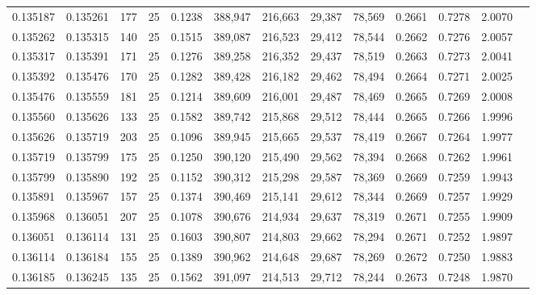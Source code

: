 \begin{tabular}{rrrrrrrrrrrrr}
0.135187 & 0.135261 &   177 &  25 &                                     0.1238 & 388,947 & 216,663 &  29,387 &  78,569 & 0.2661 & 0.7278 & 2.0070 \\
0.135262 & 0.135315 &   140 &  25 &                                     0.1515 & 389,087 & 216,523 &  29,412 &  78,544 & 0.2662 & 0.7276 & 2.0057 \\
0.135317 & 0.135391 &   171 &  25 &                                     0.1276 & 389,258 & 216,352 &  29,437 &  78,519 & 0.2663 & 0.7273 & 2.0041 \\
0.135392 & 0.135476 &   170 &  25 &                                     0.1282 & 389,428 & 216,182 &  29,462 &  78,494 & 0.2664 & 0.7271 & 2.0025 \\
0.135476 & 0.135559 &   181 &  25 &                                     0.1214 & 389,609 & 216,001 &  29,487 &  78,469 & 0.2665 & 0.7269 & 2.0008 \\
0.135560 & 0.135626 &   133 &  25 &                                     0.1582 & 389,742 & 215,868 &  29,512 &  78,444 & 0.2665 & 0.7266 & 1.9996 \\
0.135626 & 0.135719 &   203 &  25 &                                     0.1096 & 389,945 & 215,665 &  29,537 &  78,419 & 0.2667 & 0.7264 & 1.9977 \\
0.135719 & 0.135799 &   175 &  25 &                                     0.1250 & 390,120 & 215,490 &  29,562 &  78,394 & 0.2668 & 0.7262 & 1.9961 \\
0.135799 & 0.135890 &   192 &  25 &                                     0.1152 & 390,312 & 215,298 &  29,587 &  78,369 & 0.2669 & 0.7259 & 1.9943 \\
0.135891 & 0.135967 &   157 &  25 &                                     0.1374 & 390,469 & 215,141 &  29,612 &  78,344 & 0.2669 & 0.7257 & 1.9929 \\
0.135968 & 0.136051 &   207 &  25 &                                     0.1078 & 390,676 & 214,934 &  29,637 &  78,319 & 0.2671 & 0.7255 & 1.9909 \\
0.136051 & 0.136114 &   131 &  25 &                                     0.1603 & 390,807 & 214,803 &  29,662 &  78,294 & 0.2671 & 0.7252 & 1.9897 \\
0.136114 & 0.136184 &   155 &  25 &                                     0.1389 & 390,962 & 214,648 &  29,687 &  78,269 & 0.2672 & 0.7250 & 1.9883 \\
0.136185 & 0.136245 &   135 &  25 &                                     0.1562 & 391,097 & 214,513 &  29,712 &  78,244 & 0.2673 & 0.7248 & 1.9870 \\

\end{tabular}
